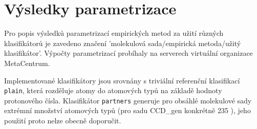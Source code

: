 \section{Výsledky parametrizace}
Pro popis výsledků parametrizací empirických metod za užití různých klasifikátorů je zavedeno značení 'molekulová sada/empirická metoda/užitý klasifikátor'. Výpočty  parametrizací probíhaly na serverech virtuální organizace MetaCentrum. 

Implementované klasifikátory jsou srovnány s triviální referenční klasifikací \verb|plain|, která rozděluje atomy do atomových typů na základě hodnoty protonového čísla. 
Klasifikátor \verb|partners| generuje pro obsáhlé molekulové sady extrémní množství atomových typů (pro sadu CCD\_gen konkrétně 235%
), jeho použití proto nelze obecně doporučit. 

